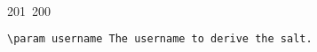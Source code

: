 201~200~\documentclass{article}
\begin{document}
\begin{lstlisting}[language=Python, caption=Key Derivation with HKDF]
	                                                                                                                                                                                                                                                                                                	                                                                                                                                        	    	                                                                                                	                                                                                                                                                                                                                                                                                                                                	                                                            \param username The username to derive the salt.
	                                                                                                                                                                                                                                                                                                	                                                                                                                                        	    	                                                                                                	                                                                                                                                                                                                                                                                                                                                	                                                                \return The derived salt.
	                                                                                                                                                                                                                                                                                                	                                                                                                                                        	    	                                                                                                	                                                                                                                                                                                                                                                                                                                                	                                                                    """

\end{lstlisting}
\end{document}
